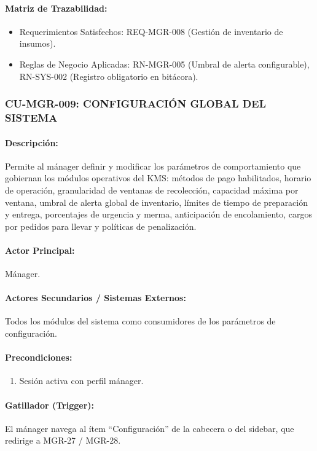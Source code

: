 \paragraph{Matriz de Trazabilidad:}
\begin{itemize}
    \item Requerimientos Satisfechos: REQ-MGR-008 (Gestión de inventario de insumos).
    \item Reglas de Negocio Aplicadas: RN-MGR-005 (Umbral de alerta configurable), RN-SYS-002 (Registro obligatorio en bitácora).
\end{itemize}

\subsubsection{CU-MGR-009: CONFIGURACIÓN GLOBAL DEL SISTEMA}
\paragraph{Descripción:} Permite al mánager definir y modificar los parámetros de comportamiento que gobiernan los módulos operativos del KMS: métodos de pago habilitados, horario de operación, granularidad de ventanas de recolección, capacidad máxima por ventana, umbral de alerta global de inventario, límites de tiempo de preparación y entrega, porcentajes de urgencia y merma, anticipación de encolamiento, cargos por pedidos para llevar y políticas de penalización.

\paragraph{Actor Principal:} Mánager.

\paragraph{Actores Secundarios / Sistemas Externos:} Todos los módulos del sistema como consumidores de los parámetros de configuración.

\paragraph{Precondiciones:}
\begin{enumerate}
    \item[I.] Sesión activa con perfil mánager.
\end{enumerate}

\paragraph{Gatillador (Trigger):} El mánager navega al ítem ``Configuración'' de la cabecera o del sidebar, que redirige a MGR-27 / MGR-28.


